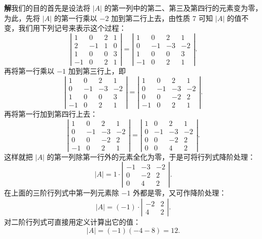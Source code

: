 \documentclass[UTF8, 12pt, fontset=fandol, oneside]{ctexart}
\begin{document}
\noindent\textbf{解}\quad 我们的目的首先是设法将 $|A|$ 的第一列中的第二、第三及第四行的元素变为零，为此，先将 $|A|$ 的第一行乘以 $-2$ 加到第二行上去，由性质 7 可知 $|A|$ 的值不变，我们用下列记号来表示这个过程：
\[
\left|\begin{array}{rrrr}
1 & 0 & 2 & 1\\
2 & -1 & 1 & 0\\
1 & 0 & 0 & 3\\
-1 & 0 & 2 & 1
\end{array}\right|
=
\left|\begin{array}{rrrr}
1 & 0 & 2 & 1\\
0 & -1 & -3 & -2\\
1 & 0 & 0 & 3\\
-1 & 0 & 2 & 1
\end{array}\right|.
\]
再将第一行乘以 $-1$ 加到第三行上，即
\[
\left|\begin{array}{rrrr}
1 & 0 & 2 & 1\\
0 & -1 & -3 & -2\\
1 & 0 & 0 & 3\\
-1 & 0 & 2 & 1
\end{array}\right|
=
\left|\begin{array}{rrrr}
1 & 0 & 2 & 1\\
0 & -1 & -3 & -2\\
0 & 0 & -2 & 2\\
-1 & 0 & 2 & 1
\end{array}\right|.
\]
再将第一行加到第四行上去：
\[
\left|\begin{array}{rrrr}
1 & 0 & 2 & 1\\
0 & -1 & -3 & -2\\
0 & 0 & -2 & 2\\
-1 & 0 & 2 & 1
\end{array}\right|
=
\left|\begin{array}{rrrr}
1 & 0 & 2 & 1\\
0 & -1 & -3 & -2\\
0 & 0 & -2 & 2\\
0 & 0 & 4 & 2
\end{array}\right|.
\]
这样就把 $|A|$ 的第一列除第一行外的元素全化为零，于是可将行列式降阶处理：
\[
|A|=1\cdot
\left|\begin{array}{rrr}
-1 & -3 & -2\\
0 & -2 & 2\\
0 & 4 & 2
\end{array}\right|.
\]
在上面的三阶行列式中第一列元素除 $-1$ 外都是零，又可作降阶处理：
\[
|A|=(-1)\cdot
\left|\begin{array}{rr}
-2 & 2\\
4 & 2
\end{array}\right|.
\]
对二阶行列式可直接用定义计算出它的值：
\[
|A|=(-1)(-4-8)=12.
\]
\end{document}
